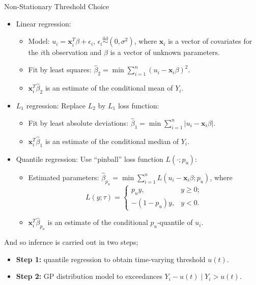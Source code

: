 \documentclass[10pt, hyperref={colorlinks = true,linkcolor = blue}]{beamer}
\begin{document}
{{{\begin{frame}{Non-Stationary Threshold Choice}
\begin{itemize}
        \item Linear regression:
        \begin{itemize}
            \item Model: \(u_i = \mathbf{x}_i^T \beta + \epsilon_i\), \(\epsilon_i \overset{\text{iid}}{\sim} (0, \sigma^2)\), where \(\mathbf{x}_i\) is a vector of covariates for the \(i\)th observation and \(\beta\) is a vector of unknown parameters.
            \item Fit by least squares: \(\hat{\beta}_2 = \min \sum_{i=1}^{n}(u_i - \mathbf{x}_i \beta)^2\).
            \item \(\mathbf{x}_i^T \hat{\beta}_2\) is an estimate of the conditional mean of \(Y_i\).
        \end{itemize}
        \item \(L_1\) regression: Replace \(L_2\) by \(L_1\) loss function:
        \begin{itemize}
            \item Fit by least absolute deviations: \(\hat{\beta}_1 = \min \sum_{i=1}^{n} |u_i - \mathbf{x}_i \beta|\).
            \item \(\mathbf{x}_i^T \hat{\beta}_1\) is an estimate of the conditional median of \(Y_i\).
        \end{itemize}
        \item Quantile regression: Use “pinball” loss function \(L(\cdot; p_u)\):
        \begin{itemize}
            \item Estimated parameters: \(\hat{\beta}_{p_u} = \min \sum_{i=1}^{n} L(u_i - \mathbf{x}_i \beta; p_u)\), where
            \[
            L(y; \tau) =
            \begin{cases} 
            p_u y, & y \geq 0; \\
            -(1 - p_u) y, & y < 0.
            \end{cases}
            \]
            \item \(\mathbf{x}_i^T \hat{\beta}_{p_u}\) is an estimate of the conditional \(p_u\)-quantile of \(u_i\).
        \end{itemize}
    \end{itemize}
    And so infernce is carried out in two steps;
\begin{itemize}
    \item \textbf{Step 1:} quantile regression to obtain time-varying threshold \(u(t)\).
    \item \textbf{Step 2:} GP distribution model to exceedances \(Y_i - u(t) \mid Y_i > u(t)\).
\end{itemize}


\end{frame}}}}
\end{document}
